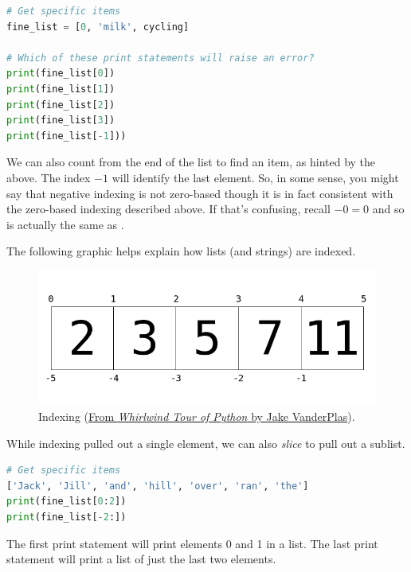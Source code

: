 \begin{lstlisting}[language = Python]
# Get specific items
fine_list = [0, 'milk', cycling]

# Which of these print statements will raise an error?
print(fine_list[0])
print(fine_list[1])
print(fine_list[2])
print(fine_list[3])
print(fine_list[-1])) \end{lstlisting}


We can also count from the end of the list to find an item, as hinted by the 
 above. The index $-1$ will identify the last element. So, in some sense, you might say that negative indexing
is not zero-based though it is in fact consistent with the zero-based indexing described above. If that's confusing, recall $-0 = 0$ and so  
is actually the same as .


The following graphic helps explain how lists (and strings) are indexed.

\begin{figure}[h!] 
\begin{center} 
\includegraphics[width = .55\textwidth]{list_indexing.png}
\caption{Indexing (\textcolor{blue}{\href{https://jakevdp.github.io/WhirlwindTourOfPython/06-built-in-data-structures.html}{From \emph{Whirlwind Tour of Python} by Jake VanderPlas}}).}
\label{fig:while}
\end{center}
\end{figure}



\bigskip

While indexing pulled out a single element, we can also \emph{slice} to pull out a sublist. 


\begin{lstlisting}[language = Python]
# Get specific items
['Jack', 'Jill', 'and', 'hill', 'over', 'ran', 'the']
print(fine_list[0:2])
print(fine_list[-2:]) \end{lstlisting}

The first print statement will print elements 0 and 1 in a list. The last print statement will print a list of just the last two elements.



